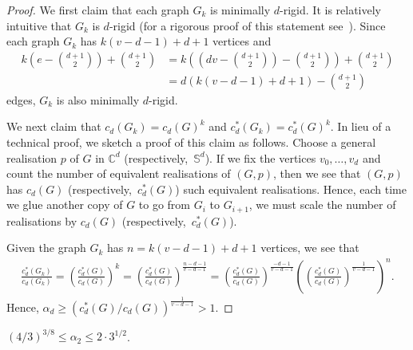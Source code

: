 \documentclass[ALCO]{cedram}
\begin{document}
\begin{proof}
	We first claim that each graph $G_k$ is minimally $d$-rigid.
	It is relatively intuitive that $G_k$ is $d$-rigid (for a rigorous proof of this statement see~\cite[Theorem 2.5.2]{GraverServatius}).
	Since each graph $G_k$ has $k(v -d-1) + d+1$ vertices and
	\begin{align*}
		k\left(e- \binom{d+1}{2} \right) +\binom{d+1}{2} 
		&= k\left(\left(dv - \binom{d+1}{2}\right) - \binom{d+1}{2} \right) +\binom{d+1}{2}  \\
		&= d(k(v -d-1) + d+1) - \binom{d+1}{2} 
	\end{align*}
	edges,
	$G_k$ is also minimally $d$-rigid.
	
	We next claim that $c_d(G_k) = c_d(G)^k$ and $c^*_d(G_k) = c^*_d(G)^k$.
	In lieu of a technical proof, we sketch a proof of this claim as follows.
	Choose a general realisation $p$ of $G$ in $\mathbb{C}^d$ (respectively,~$\mathbb{S}^d$).
	If we fix the vertices $v_0,\ldots,v_d$ and count the number of equivalent realisations of $(G,p)$,
	then we see that $(G,p)$ has $c_d(G)$ (respectively,~$c^*_d(G)$) such equivalent realisations.
	Hence, each time we glue another copy of $G$ to go from $G_i$ to $G_{i+1}$,
	we must scale the number of realisations by $c_d(G)$ (respectively,~$c^*_d(G)$).
	
	Given the graph $G_k$ has $n = k(v -d-1) + d+1$ vertices,
	we see that
	\begin{align*}
		\frac{c^*_d(G_k)}{c_d(G_k)} = \left( \frac{c^*_d(G)}{c_d(G)} \right)^k = \left( \frac{c^*_d(G)}{c_d(G)} \right)^{\frac{n-d-1}{v-d-1}} = \left( \frac{c^*_d(G)}{c_d(G)} \right)^{\frac{-d-1}{v-d-1}} \left( \left( \frac{c^*_d(G)}{c_d(G)} \right)^{\frac{1}{v-d-1}} \right)^n.
	\end{align*}
	Hence, $\alpha_d \geq \left( c^*_d(G)/c_d(G)\right)^{\frac{1}{v-d-1}}  >1$.
\end{proof}


\begin{corollary}\label{c:asym12}
	$(4/3)^{3/8} \leq \alpha_2 \leq 2 \cdot 3^{1/2}$.
\end{corollary}
\end{document}
